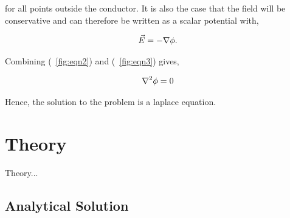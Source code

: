 \documentclass[aps,twocolumn,pre,nofootinbib]{revtex4}
\begin{document}
for all points outside the conductor. It is also the case that the field will be conservative and can therefore be written as a scalar potential with,

\begin{equation}
\begin{split}
\vec{E}= -\nabla\phi.
\end{split}
\label{eqn3}
\end{equation}

Combining (~\ref{fig:eqn2}) and (~\ref{fig:eqn3}) gives,

\begin{equation}
\begin{split}
\nabla^2\phi=0
\end{split}
\label{eqn4}
\end{equation}

Hence, the solution to the problem is a laplace equation.




 

\section{Theory \label{sec:the}}

Theory...


\subsection{Analytical Solution}

\end{document}
